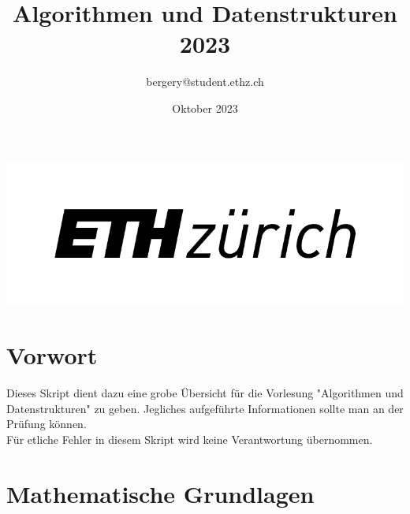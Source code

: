 \documentclass[a4paper]{article}
\title{Algorithmen und Datenstrukturen 2023}
\author{bergery@student.ethz.ch}
\date{Oktober 2023}
\begin{document}
\maketitle
\begin{center}
    \includegraphics{Pictures/eth_logo_kurz_pos Kopie.png}
\end{center}

\tableofcontents
\newpage

\section{Vorwort}
Dieses Skript dient dazu eine grobe Übersicht für die Vorlesung "Algorithmen und Datenstrukturen" zu geben. Jegliches aufgeführte Informationen sollte man an der Prüfung können.\\
Für etliche Fehler in diesem Skript wird keine Verantwortung übernommen.

\section{Mathematische Grundlagen}
\end{document}
